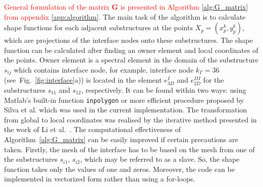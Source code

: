 \documentclass[sensors,article,submit,moreauthors,pdftex]{Definitions/mdpi}
\begin{document}
\textcolor{red}{General formulation of the matrix \textbf{G} is presented in Algorithm \ref{alg:G_matrix} from appendix \ref{app:algorithm}.}
The main task of the algorithm is to calculate shape functions for each adjacent substructures at the points \(X_p=(x_p^k,y_p^k)\), which are projections of the interface nodes onto these substructures.
The shape function can be calculated after finding an owner element and local coordinates of the points.
Owner element is a spectral element in the domain of the substructure \(s_{ij}\) which contains interface node, for example, interface node \(k_\Gamma=36\) (see~Fig.~\ref{fig:interface}a)) is located in the element \(e^{I}_{3D}\) and \(e^{III}_{2D}\) for the substructures \(s_{11}\) and \(s_{12}\), respectively.
It can be found within two ways: using Matlab's built-in function \verb+inpolygon+ or more efficient procedure proposed by Silva et al. \cite{silva2009exact} which was used in the current implementation.
The transformation from global to local coordinates was realised by the iterative method presented in the work of Li et al.~\cite{li2014efficient}.
The computational effectiveness of Algorithm~\ref{alg:G_matrix} can be easily improved if certain precautions are taken.
Firstly, the mesh of the interface has to be based on the mesh from one of the substructures \(s_{i1}\), \(s_{i2}\), which may be referred to as a slave.
So, the shape function takes only the values of one and zeros.
Moreover, the code can be implemented in vectorized form rather than using a for-loops.
\end{document}
